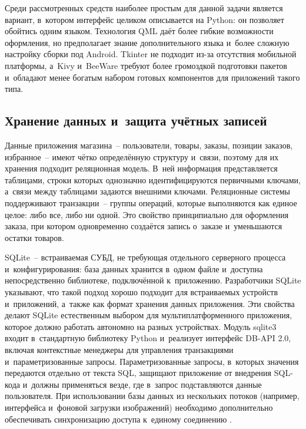 \documentclass[14pt,a4paper]{extarticle}
\begin{document}
Среди рассмотренных средств наиболее простым для данной задачи является вариант, в~котором интерфейс целиком описывается на Python: он позволяет обойтись одним языком. Технология QML даёт более гибкие возможности оформления, но предполагает знание дополнительного языка и~более сложную настройку сборки под Android. Tkinter не подходит из-за отсутствия мобильной платформы, а~Kivy и~BeeWare требуют более громоздкой подготовки пакетов и~обладают менее богатым набором готовых компонентов для приложений такого типа.



\subsection{Хранение данных и~защита учётных записей}

Данные приложения магазина~– пользователи, товары, заказы, позиции заказов, избранное~– имеют чётко определённую структуру и~связи, поэтому для их хранения подходит реляционная модель. В~ней информация представляется таблицами, строки которых однозначно идентифицируются первичными ключами, а~связи между таблицами задаются внешними ключами. Реляционные системы поддерживают транзакции~– группы операций, которые выполняются как единое целое: либо все, либо ни одной. Это свойство принципиально для оформления заказа, при котором одновременно создаётся запись о~заказе и~уменьшаются остатки товаров.



SQLite~– встраиваемая СУБД, не требующая отдельного серверного процесса и~конфигурирования: база данных хранится в~одном файле и~доступна непосредственно библиотеке, подключённой к~приложению. Разработчики SQLite указывают, что такой подход хорошо подходит для встраиваемых устройств и~приложений, а~также как формат хранения данных приложения. Эти свойства делают SQLite естественным выбором для мультиплатформенного приложения, которое должно работать автономно на разных устройствах. Модуль sqlite3 входит в~стандартную библиотеку Python и~реализует интерфейс DB-API 2.0, включая контекстные менеджеры для управления транзакциями и~параметризованные запросы. Параметризованные запросы, в~которых значения передаются отдельно от текста SQL, защищают приложение от внедрения SQL-кода и~должны применяться везде, где в~запрос подставляются данные пользователя. При использовании базы данных из нескольких потоков (например, интерфейса и~фоновой загрузки изображений) необходимо дополнительно обеспечивать синхронизацию доступа к~единому соединению \cite{b1,b7}.
\end{document}

